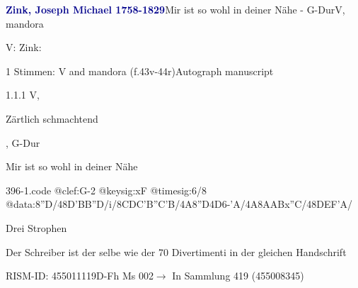 \documentclass[twocolumn]{book}
\begin{document}
\par \vspace{7pt} \textcolor{darkblue}{\textbf{Zink, Joseph Michael  1758-1829}}\hfillplus{\textbf{[396]}}\newline Mir ist so wohl in deiner Nähe - G-Dur\newline V, mandora
\par \begin{itshape}[at left, f.43v:] V: Zink:\end{itshape} 
\par \textcolor{darkblue}{}  1 Stimmen: V and mandora  (f.43v-44r)\newline Autograph manuscript
\par 1.1.1  V, \begin{itshape}Zärtlich schmachtend\end{itshape}, G-Dur\newline \begin{footnotesize} Mir ist so wohl in deiner Nähe \end{footnotesize}  
\begin{filecontents*}{396-1.code}
@clef:G-2
@keysig:xF
@timesig:6/8
@data:8''D/48D'BB''D/i/{8CD}C{'B''C}'B/4A8''D4D6-'A/4A8A{AB}x''C/48DEF'A/
\end{filecontents*}
\newline
%
\par Drei Strophen
\par Der Schreiber ist der selbe wie der 70 Divertimenti in der gleichen Handschrift
\par RISM-ID: 455011119\newline D-Fh  Ms 002\newline $\rightarrow$ In Sammlung 419 (455008345)
      
\end{document}
